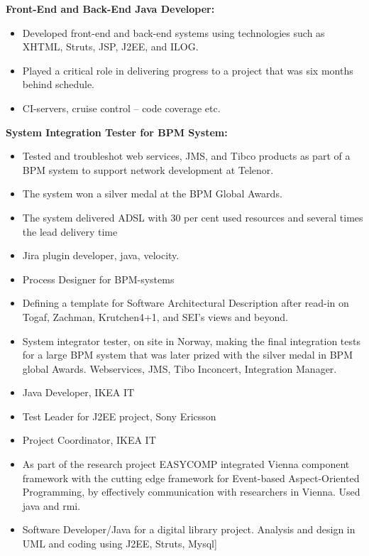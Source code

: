 \documentclass[11pt,a4paper,sans]{moderncv}
\begin{document}
{
    \textbf{Front-End and Back-End Java Developer:}
    \begin{itemize}
        \item Developed front-end and back-end systems using technologies such as XHTML, Struts, JSP, J2EE, and ILOG.
        \item Played a critical role in delivering progress to a project that was six months behind schedule.
        \item CI-servers, cruise control – code coverage etc. 
    \end{itemize}

    \textbf{System Integration Tester for BPM System:}
    \begin{itemize}
        \item Tested and troubleshot web services, JMS, and Tibco products as part of a BPM system to support network development at Telenor.
        \item The system won a silver medal at the BPM Global Awards.
        \item The system delivered ADSL with 30 per cent used resources and several times the lead delivery time
    \end{itemize}
}



\begin{itemize}
    \item Jira plugin developer, java, velocity. 
    \item Process Designer for BPM-systems 
    \item Defining a template for Software Architectural Description after read-in on Togaf, Zachman, Krutchen4+1, and SEI’s views and beyond. 
    \item  System integrator tester, on site in Norway, making the final integration tests for a large BPM system that was later prized with the silver medal in BPM global Awards. Webservices, JMS, Tibo Inconcert, Integration Manager. 
    \item Java Developer, IKEA IT 
    \item Test Leader for J2EE project, Sony Ericsson 
    \item Project Coordinator, IKEA IT 
\end{itemize}



\begin{itemize}
 \item As part of the research project EASYCOMP integrated Vienna component framework with the cutting edge framework for Event-based Aspect-Oriented Programming, by effectively communication with researchers in Vienna. Used java and rmi. 

 \item Software Developer/Java for a digital library project. Analysis and design in UML and coding using J2EE, Struts, Mysql] 
\end{itemize}
\end{document}
